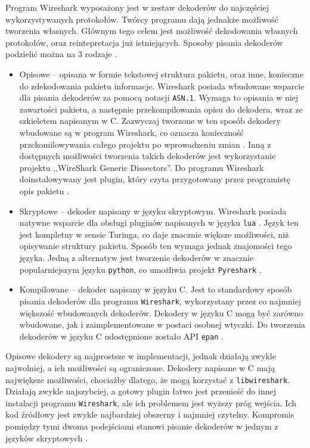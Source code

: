 \documentclass[a4paper, 11pt, twoside, openright]{article}
\begin{document}
	\indent\par
	Program Wireshark wyposażony jest w zestaw dekoderów do najczęściej wykorzystywanych protokołów. Twórcy programu
	dają jednakże możliwość tworzenia własnych. Głównym tego celem jest możliwość
	dekodowania własnych protokołów, oraz reintepretacja już istniejących. Sposoby pisania dekoderów podzielić można na 3 rodzaje \cite{SF15US}.
	\begin{itemize}
		\item Opisowe -- opisana w formie tekstowej struktura pakietu, oraz inne, konieczne do zdekodowania pakietu informacje.
			Wireshark posiada wbudowane wsparcie dla pisania dekoderów za pomocą notacji \texttt{ASN.1}. Wymaga to opisania
			w niej zawartości pakietu, a następnie przekompilowania opisu do dekodera, wraz ze szkieletem napisanym w C.
			Zazwyczaj tworzone w ten sposób dekodery wbudowane są w program Wireshark, co oznacza konieczność przekomilowywania
			całego projektu po wprowadzeniu zmian \cite{ASN.1 dissectors}.
			Inną z dostępnych możliwości tworzenia takich dekoderów jest wykorzystanie projektu ,,WireShark Generic Dissectors''.
			Do programu Wireshark doinstalowywany jest plugin, który czyta przygotowany przez programistę opis pakietu \cite{WSGD}.
		\item Skryptowe -- dekoder napisany w języku skryptowym. Wireshark posiada natywne wsparcie dla obsługi pluginów
			napisanych w języku \texttt{lua} \cite{Lua dissectors}. Język ten jest kompletny w sensie Turinga, co daje znacznie większe możliwości,
			niż opisywanie struktury pakietu. Sposób ten wymaga jednak znajomości tego języka. Jedną z alternatyw jest tworzenie
			dekoderów w znacznie popularniejszym języku \texttt{python}, co umożliwia projekt \texttt{Pyreshark} \cite{Python dissectors}.
		\item Kompilowane -- dekoder napisany w języku C. Jest to standardowy sposób pisania dekoderów dla programu \texttt{Wireshark},
			wykorzystany przez co najmniej większość wbudowanych dekoderów. Dekodery w języku C mogą być zarówno wbudowane,
			jak i zaimplementowane w postaci osobnej wtyczki. Do tworzenia dekoderów w języku C udostępnione zostało API \texttt{epan} \cite{C dissectors}.
	\end{itemize}

	Opisowe dekodery są najprostsze w implementacji, jednak działają zwykle najwolniej, a ich możliwości są ograniczone.
	Dekodery napisane w C mają największe możliwości, chociażby dlatego, że mogą korzystać z \texttt{libwireshark}. Działają zwykle
	najszybciej, a gotowy plugin łatwo jest przenieść do innej instalacji programu \texttt{Wireshark}, ale ich problemem jest wyższy próg wejścia.
	Ich kod źródłowy jest zwykle najbardziej obszerny i najmniej czytelny. Kompromis pomiędzy tymi dwoma podejściami
	stanowi pisanie dekoderów w jednym z języków skryptowych \cite{SF18US}.
\end{document}
